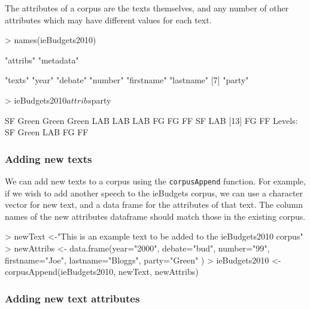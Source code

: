 \documentclass[11pt]{article}
\begin{document}
The attributes of a corpus are the texts themselves, and any number of other attributes which may have different values for each text.

\begin{Schunk}
\begin{Sinput}
> names(ieBudgets2010)
\end{Sinput}
\begin{Soutput}
[1] "attribs"  "metadata"
\end{Soutput}
\begin{Soutput}
[1] "texts"     "year"      "debate"    "number"    "firstname" "lastname" 
[7] "party"    
\end{Soutput}
\begin{Sinput}
> ieBudgets2010$attribs$party
\end{Sinput}
\begin{Soutput}
 [1] SF    Green Green Green LAB   LAB   LAB   FG    FG    FF    SF    LAB  
[13] FG    FF   
Levels: SF Green LAB FG FF
\end{Soutput}
\end{Schunk}


\subsubsection{Adding new texts}

We can add new texts to a corpus using the \texttt{corpusAppend} function. For example, if we wish to add another speech to the ieBudgets corpus, we can use a character vector for new text, and a data frame for the attributes of that text. The column names of the new attributes dataframe should match those in the existing corpus. 

\begin{Schunk}
\begin{Sinput}
> newText <-"This is an example text to be added to the ieBudgets2010 corpus"
> newAttribs <- data.frame(year="2000", debate="bud", number="99", firstname="Joe", lastname="Bloggs", party="Green" )
> ieBudgets2010 <- corpusAppend(ieBudgets2010, newText, newAttribs)
\end{Sinput}
\end{Schunk}


\subsubsection{Adding new text attributes}
\end{document}
